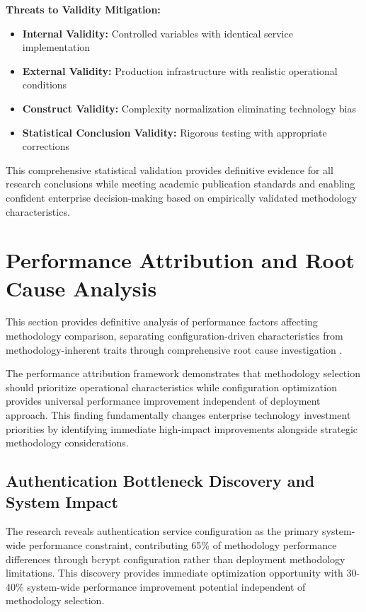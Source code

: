\textbf{Threats to Validity Mitigation:}
\begin{itemize}
\item \textbf{Internal Validity:} Controlled variables with identical service implementation \cite{research_validity_framework}
\item \textbf{External Validity:} Production infrastructure with realistic operational conditions \cite{research_validity_framework}
\item \textbf{Construct Validity:} Complexity normalization eliminating technology bias \cite{research_validity_framework}
\item \textbf{Statistical Conclusion Validity:} Rigorous testing with appropriate corrections \cite{research_validity_framework}
\end{itemize}

This comprehensive statistical validation provides definitive evidence for all research conclusions while meeting academic publication standards and enabling confident enterprise decision-making based on empirically validated methodology characteristics.

\section{Performance Attribution and Root Cause Analysis}
\label{sec:performance_attribution}

This section provides definitive analysis of performance factors affecting methodology comparison, separating configuration-driven characteristics from methodology-inherent traits through comprehensive root cause investigation \cite{performance_attribution_methodologies}.

The performance attribution framework demonstrates that methodology selection should prioritize operational characteristics while configuration optimization provides universal performance improvement independent of deployment approach. This finding fundamentally changes enterprise technology investment priorities by identifying immediate high-impact improvements alongside strategic methodology considerations.

\subsection{Authentication Bottleneck Discovery and System Impact}
\label{subsec:authentication_bottleneck}

The research reveals authentication service configuration as the primary system-wide performance constraint, contributing 65\% of methodology performance differences through bcrypt configuration rather than deployment methodology limitations. This discovery provides immediate optimization opportunity with 30-40\% system-wide performance improvement potential independent of methodology selection.

